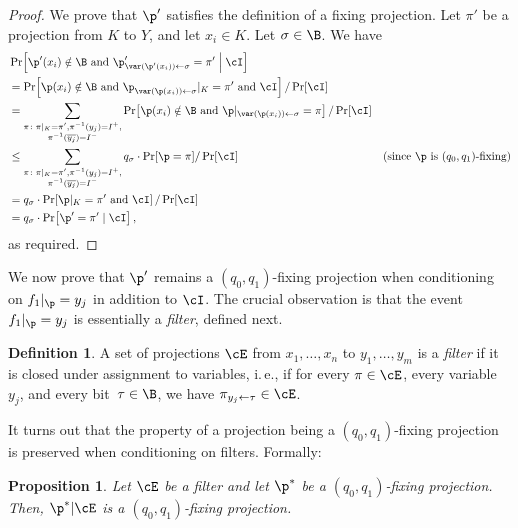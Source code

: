 \documentclass[11pt]{article}
\numberwithin{equation}{section}
\newtheorem{proposition}[theorem]{Proposition}
\theoremstyle{definition}
\newtheorem{definition}[theorem]{Definition}
\theoremstyle{plain}
\newcommand{\ie}{i.\,e.}
\theoremstyle{definition}\newtheorem{notation}[theorem]{Notation}\theoremstyle{plain}
\begin{document}
\begin{proof}
We prove that $\p'$ satisfies the definition of a fixing projection.
Let $\pi'$ be a projection from $K$ to $Y$, and let $x_{i}\in K$.
Let $\sigma\in\B$. We have 
\begin{align*}
 & \Pr\!\left[\p'(x_{i})\notin\B\text{ and }\p'_{\var(\p'(x_{i}))\gets\sigma}=\pi'\;\middle|\;\cI\right]\\
 & =\Pr\!\left[\p(x_{i})\notin\B\text{ and }\p_{\var(\p(x_{i}))\gets\sigma}|_{K}=\pi'\text{ and }\cI\right]/\Pr\!\left[\cI\right]\\
 & =\sum_{\substack{\pi\colon\pi|_{K}=\pi',\pi^{-1}(y_{j})=I^{+},\\
\pi^{-1}(\overline{y_{j}})=I^{-}
}
}\Pr\!\left[\p(x_{i})\notin\B\text{ and }\p|_{\var(\p(x_{i}))\gets\sigma}=\pi\right]/\Pr\!\left[\cI\right]\\
 & \le\sum_{\substack{\pi\colon\pi|_{K}=\pi',\pi^{-1}(y_{j})=I^{+},\\
\pi^{-1}(\overline{y_{j}})=I^{-}
}
}q_{\sigma}\cdot\Pr[\p=\pi]/\Pr\!\left[\cI\right] & \text{(since \ensuremath{\p} is \ensuremath{(q_{0},q_{1})}-fixing)}\\
 & =q_{\sigma}\cdot\Pr\!\left[\p|_{K}=\pi'\text{ and }\cI\right]/\Pr\!\left[\cI\right]\\
 & =q_{\sigma}\cdot\Pr\!\left[\p'=\pi'\mid\cI\right],
\end{align*}
as required. 
\end{proof}
We now prove that $\p'$ remains a $(q_{0},q_{1})$-fixing projection
when conditioning on $f_{1}|_{\p}=y_{j}$ in addition to $\cI$. The
crucial observation is that the event $f_{1}|_{\p}=y_{j}$ is essentially
a \emph{filter}, defined next. 
\begin{definition}
A set of projections $\cE$ from $x_{1},\ldots,x_{n}$ to $y_{1},\ldots,y_{m}$
is a \emph{filter} if it is closed under assignment to variables,
\ie, if for every $\pi\in\cE$, every variable~$y_{j}$, and every
bit~$\tau\in\B$, we have $\pi_{y_{j}\gets\tau}\in\cE$. 
\end{definition}

It turns out that the property of a projection being a $(q_{0},q_{1})$-fixing
projection is preserved when conditioning on filters. Formally: 
\begin{proposition}
\label{prop:conditioning-on-a-filter}Let $\cE$ be a filter and let $\p^{*}$
be a $(q_{0},q_{1})$-fixing projection. Then, $\p^{*}|\cE$ is a
$(q_{0},q_{1})$-fixing projection. 
\end{proposition}
\end{document}
